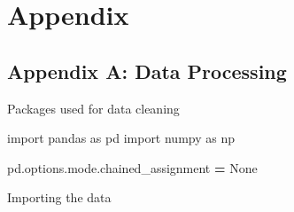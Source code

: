 \documentclass[mstat,12pt]{unswthesis}
\newenvironment{Shaded}{\begin{snugshade}}{\end{snugshade}}
\newcommand{\ImportTok}[1]{#1}
\newcommand{\NormalTok}[1]{#1}
\newcommand{\OperatorTok}[1]{\textcolor[rgb]{0.81,0.36,0.00}{\textbf{#1}}}
\newcommand{\VariableTok}[1]{\textcolor[rgb]{0.00,0.00,0.00}{#1}}
\begin{document}
\chapter*{Appendix}\label{appendix}

\appendix

\section*{Appendix A: Data Processing}\label{appendix-a-data-processing}

Packages used for data cleaning

\begin{Shaded}
\begin{Highlighting}[]
\ImportTok{import}\NormalTok{ pandas }\ImportTok{as}\NormalTok{ pd}
\ImportTok{import}\NormalTok{ numpy }\ImportTok{as}\NormalTok{ np}

\NormalTok{pd.options.mode.chained\_assignment }\OperatorTok{=} \VariableTok{None}
\end{Highlighting}
\end{Shaded}

Importing the data
\end{document}

